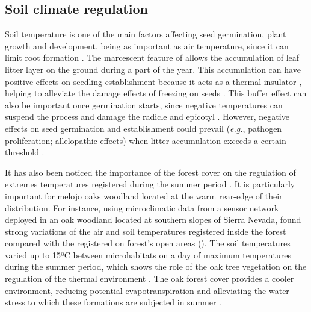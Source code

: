 \subsection{Soil climate regulation}\label{sec:es:regulation-soil}
Soil temperature is one of the main factors affecting seed germination, plant growth and development, being as important as air temperature, since it can limit root formation \autocites{AlvarezUriaKorner2007LowTemperature}. The marcescent feature of \Qp allows the accumulation of leaf litter layer on the ground during a part of the year. This accumulation can have positive effects on seedling establishment because it acts as a thermal insulator \autocites{Loydietal2014DistributionEffects}, helping to alleviate the damage effects of freezing on seeds \autocites{Loydietal2014DistributionEffects,CavenderBaresetal2005SummerWinter,EstesoMartinezGilPelegrin2004FrostResistance,Lofetal2019TammReview}. This buffer effect can also be important once germination starts, since negative temperatures can suspend the process and damage the radicle and epicotyl \autocites{AizenWoodcock1996EffectsAcorn}. However, negative effects on seed germination and establishment could prevail (\emph{e.g.}, pathogen proliferation; allelopathic effects) when litter accumulation exceeds a certain threshold \autocites{Loydietal2014DistributionEffects,XiongNilsson1999EffectsPlant}.

It has also been noticed the importance of the forest cover on the regulation of extremes temperatures registered during the summer period \autocites{DeFrenneetal2021ForestMicroclimates}. It is particularly important for melojo oaks woodland located at the warm rear-edge of their distribution. For instance, using microclimatic data from a sensor network deployed in an oak woodland located at southern slopes of Sierra Nevada, \citet{Zamoraetal2021UniendoMacro} found strong variations of the air and soil temperatures registered inside the forest compared with the registered on forest's open areas (). The soil temperatures varied up to 15ºC between microhabitats on a day of maximum temperatures during the summer period, which shows the role of the oak tree vegetation on the regulation of the thermal environment \autocites{Niinemets2010ResponsesForest}. The oak forest cover provides a cooler environment, reducing potential evapotranspiration and alleviating the water stress to which these formations are subjected in summer \autocites{Zamoraetal2021UniendoMacro}.  

